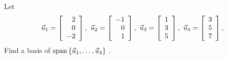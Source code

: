 \documentclass{ximera}
\begin{document}
\begin{example}
  Let
  \begin{equation*}
    \vect{u}_1 = \startmat{r} 2 \\ 0 \\ -2 \stopmat,
    \quad
    \vect{u}_2 = \startmat{r} -1 \\ 0 \\ 1 \stopmat,
    \quad
    \vect{u}_3 = \startmat{r} 1 \\ 3 \\ 5 \stopmat,
    \quad
    \vect{u}_4 = \startmat{r} 3 \\ 5 \\ 7 \stopmat,
  \end{equation*}
  Find a basis of $\sspan\set{\vect{u}_1,\ldots,\vect{u}_4}$%
  .
\end{example}
\end{document}
